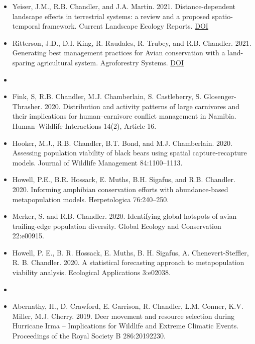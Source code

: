 \begin{itemize}
\item Yeiser, J.M., R.B. Chandler, and
  J.A. Martin. 2021. Distance-dependent landscape effects in
  terrestrial systems: a review and a proposed spatio-temporal
  framework. Current Landscape Ecology
  Reports. \href{https://doi.org/10.1007/s40823-020-00061-w}{DOI}

\item Ritterson, J.D., D.I. King, R. Raudales, R. Trubey, and
  R.B. Chandler. 2021. Generating best management practices for Avian
  conservation with a land-sparing agricultural system. Agroforestry
  Systems. \href{https://doi.org/10.1007/s10457-020-00582-7}{DOI}
  
  
\item[] { \\}

\item Fink, S, R.B. Chandler, M.J. Chamberlain, S. Castleberry,
  S. Glosenger-Thrasher. 2020. Distribution and activity patterns of 
  large carnivores and their implications for human–carnivore conflict 
  management in Namibia. Human–Wildlife Interactions 14(2), Article 16.    

\item Hooker, M.J., R.B. Chandler, B.T. Bond, and
  M.J. Chamberlain. 2020. Assessing population viability of black
  bears using spatial capture-recapture models. Journal of Wildlife
  Management 84:1100--1113.  
  
\item Howell, P.E., B.R. Hossack, E. Muths, B.H. Sigafus, and
  R.B. Chandler. 2020. Informing amphibian conservation efforts
  with abundance-based metapopulation models. Herpetologica 76:240--250. 

\item Merker, S. and R.B. Chandler. 2020. Identifying global hotspots
  of avian trailing-edge population diversity. Global Ecology and
  Conservation 22:e00915.   

\item Howell, P. E., B. R. Hossack, E. Muths, B. H. Sigafus,
  A. Chenevert-Steffler, R. B. Chandler. 2020. A statistical 
  forecasting approach to metapopulation viability
  analysis. Ecological Applications 3:e02038. 

  
\item[] { \\}

\item Abernathy, H., D. Crawford, E. Garrison, R. Chandler,
  L.M. Conner, K.V. Miller, M.J. Cherry. 2019. Deer movement and
  resource selection during Hurricane Irma -- Implications for
  Wildlife and Extreme Climatic Events. Proceedings of the Royal
  Society B 286:20192230. 
  

\end{itemize}
